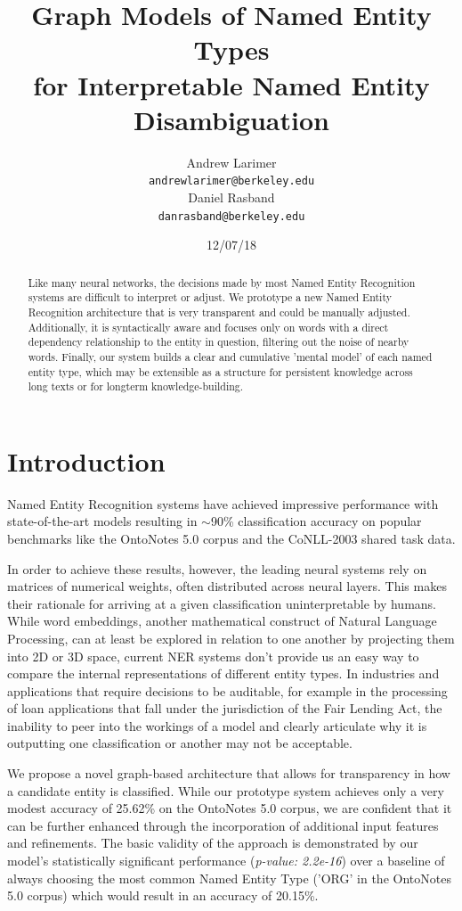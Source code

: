\documentclass[11pt,a4paper]{article}
\title{Graph Models of Named Entity Types\\for Interpretable Named Entity Disambiguation}
\author{Andrew Larimer \\
  {\tt andrewlarimer@berkeley.edu} \\\And
  Daniel Rasband \\
  {\tt danrasband@berkeley.edu} \\}
\date{12/07/18}
\begin{document}
\maketitle
\begin{abstract}
Like many neural networks, the decisions made by most Named Entity Recognition systems are difficult to interpret or adjust. We prototype a new Named Entity Recognition architecture that is very transparent and could be manually adjusted. Additionally, it is syntactically aware and focuses only on words with a direct dependency relationship to the entity in question, filtering out the noise of nearby words. Finally, our system builds a clear and cumulative 'mental model' of each named entity type, which may be extensible as a structure for persistent knowledge across long texts or for longterm knowledge-building.
\end{abstract}

\section{Introduction}
Named Entity Recognition systems have achieved impressive performance with state-of-the-art models resulting in $\sim$90\% classification accuracy on popular benchmarks like the OntoNotes 5.0 corpus and the CoNLL-2003 shared task data.

In order to achieve these results, however, the leading neural systems rely on matrices of numerical weights, often distributed across neural layers. This makes their rationale for arriving at a given classification uninterpretable by humans. While word embeddings, another mathematical construct of Natural Language Processing, can at least be explored in relation to one another by projecting them into 2D or 3D space, current NER systems don't provide us an easy way to compare the internal representations of different entity types. In industries and applications that require decisions to be auditable, for example in the processing of loan applications that fall under the jurisdiction of the Fair Lending Act, the inability to peer into the workings of a model and clearly articulate why it is outputting one classification or another may not be acceptable.

We propose a novel graph-based architecture that allows for transparency in how a candidate entity is classified. While our prototype system achieves only a very modest accuracy of 25.62\% on the OntoNotes 5.0 corpus, we are confident that it can be further enhanced through the incorporation of additional input features and refinements. The basic validity of the approach is demonstrated by our model's statistically significant performance (\textit{p-value: 2.2e-16}) over a baseline of always choosing the most common Named Entity Type ('ORG' in the OntoNotes 5.0 corpus) which would result in an accuracy of 20.15\%.
\end{document}
